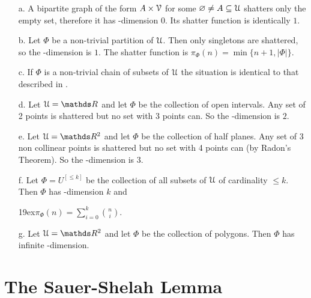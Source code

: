 \documentclass[sputnik.tex]{subfiles}
\begin{document}

\begin{example}\label{ex_vcdim}
\begin{itemize}
\item[a.] A bipartite graph of the form $A\times\EuScript V$ for some $\varnothing\neq A\subseteq\EuScript U$ shatters only the empty set, therefore it has \vc-dimension $0$.
Its shatter function is identically $1$.
\item[b.] Let $\Phi$ be a non-trivial partition of $\EuScript U$.
Then only singletons are shattered, so the \vc-dimension is $1$.
The shatter function is $\pi_\Phi(n)=\min\big\{n+1,|\Phi|\big\}$.
\item[c.] If $\Phi$ is a non-trivial chain of subsets of $\EuScript U$ the situation is identical to that described in .
\item[d.] Let $\U=\RR$ and let $\Phi$ be the collection of open intervals.
Any set of 2 points is shattered but no set with 3 points can.
So the \vc-dimension is $2$.
\item[e.] Let $\U=\RR^2$ and let $\Phi$ be the collection of half planes.
Any set of 3 non collinear points is shattered but no set with 4 points can (by Radon's Theorem).
So the \vc-dimension is $3$.
\item[f.] Let $\Phi=U^{[\le k]}$ be the collection of all subsets of $\EuScript U$ of cardinality $\le k$.
Then $\Phi$ has \vc-dimension $k$ and

\noindent\kern19ex$\displaystyle\pi_\Phi(n)=\sum^k_{i=0} \binom{n}{i}$.


\item[g.] Let $\U=\RR^2$ and let $\Phi$ be the collection of polygons.
Then $\Phi$ has infinite \vc-dimension.\QED
\end{itemize}
\end{example}

\section{The Sauer-Shelah Lemma}
\end{document}
